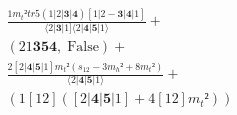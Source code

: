 \documentclass[varwidth, border=5pt]{standalone}
\begin{document}
\begin{my}
$\begin{gathered}
\scriptscriptstyle\frac{1m_t²tr5(1|2|𝟑|𝟒)[1|2-𝟑|𝟒|1]}{⟨2|𝟑|1]⟨2|𝟒|𝟓|1⟩} +\\
\scriptscriptstyle(21𝟑𝟓𝟒,\;\text{False}) +\\
\scriptscriptstyle\frac{2[2|𝟒|𝟓|1]m_t²(s_{12}-3m_h²+8m_t²)}{⟨2|𝟒|𝟓|1⟩} +\\
\scriptscriptstyle (1[12]([2|𝟒|𝟓|1]+4[12]m_t²)) \phantom{+}
\end{gathered}$
\end{my}
\end{document}
